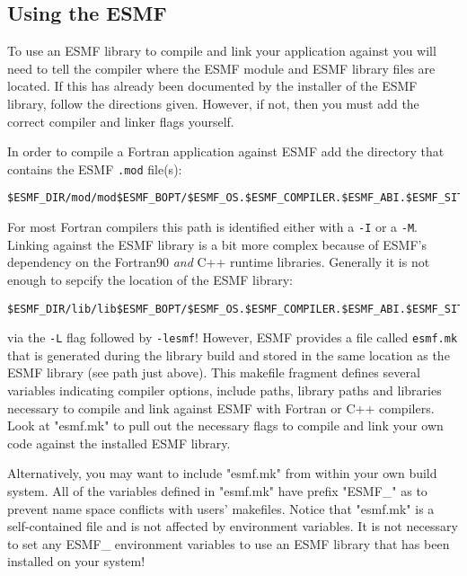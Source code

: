 
\subsection{Using the ESMF}
\label{UsingLibrary}

To use an ESMF library to compile and link your application against you will
need to tell the compiler where the ESMF module and ESMF library files
are located. If this has already been documented by the installer of the ESMF
library, follow the directions given. However, if not, then you must add the
correct compiler and linker flags yourself.

In order to compile a Fortran application against ESMF add the directory that
contains the ESMF {\tt *.mod} file(s):

\begin{verbatim}
$ESMF_DIR/mod/mod$ESMF_BOPT/$ESMF_OS.$ESMF_COMPILER.$ESMF_ABI.$ESMF_SITE
\end{verbatim} 

For most Fortran compilers this path is identified either with a {\tt -I} or a
{\tt -M}. Linking against the ESMF library is a bit more complex because of
ESMF's dependency on the Fortran90 {\em and} C++ runtime libraries. Generally
it is not enough to sepcify the location of the ESMF library:

\begin{verbatim}
$ESMF_DIR/lib/lib$ESMF_BOPT/$ESMF_OS.$ESMF_COMPILER.$ESMF_ABI.$ESMF_SITE
\end{verbatim} 

via the {\tt -L} flag followed by {\tt -lesmf}! However, ESMF provides a 
file called {\tt esmf.mk} that is generated during the library build and
stored in the same location as the ESMF library (see path just above). This
makefile fragment defines several variables indicating compiler options, include
paths, library paths and libraries necessary to compile and link against ESMF
with Fortran or C++ compilers. Look at "esmf.mk" to pull out the necessary flags
to compile and link your own code against the installed ESMF library.

Alternatively, you may want to include "esmf.mk" from within your own build
system. All of the variables defined in "esmf.mk" have prefix "ESMF\_"
as to prevent name space conflicts with users' makefiles. Notice that "esmf.mk"
is a self-contained file and is not affected by environment variables. It is
not necessary to set any ESMF\_ environment variables to use an ESMF library
that has been installed on your system!

